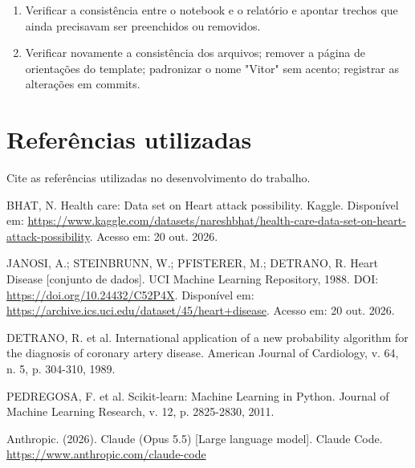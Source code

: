 \documentclass[11pt,letterpaper]{article}
\begin{document}
\begin{enumerate}
\item Verificar a consistência entre o notebook e o relatório e apontar trechos que ainda precisavam ser preenchidos ou removidos.
\item Verificar novamente a consistência dos arquivos; remover a página de orientações do template; padronizar o nome "Vitor" sem acento; registrar as alterações em commits.
\end{enumerate}

\Needspace{140pt}
\section*{Referências utilizadas}

Cite as referências utilizadas no desenvolvimento do trabalho.

BHAT, N. Health care: Data set on Heart attack possibility. Kaggle. Disponível em: \url{https://www.kaggle.com/datasets/nareshbhat/health-care-data-set-on-heart-attack-possibility}. Acesso em: 20 out. 2026.

JANOSI, A.; STEINBRUNN, W.; PFISTERER, M.; DETRANO, R. Heart Disease [conjunto de dados]. UCI Machine Learning Repository, 1988. DOI: \url{https://doi.org/10.24432/C52P4X}. Disponível em: \url{https://archive.ics.uci.edu/dataset/45/heart+disease}. Acesso em: 20 out. 2026.

DETRANO, R. et al. International application of a new probability algorithm for the diagnosis of coronary artery disease. American Journal of Cardiology, v. 64, n. 5, p. 304-310, 1989.

PEDREGOSA, F. et al. Scikit-learn: Machine Learning in Python. Journal of Machine Learning Research, v. 12, p. 2825-2830, 2011.

Anthropic. (2026). Claude (Opus 5.5) [Large language model]. Claude Code. \url{https://www.anthropic.com/claude-code}
\end{document}

